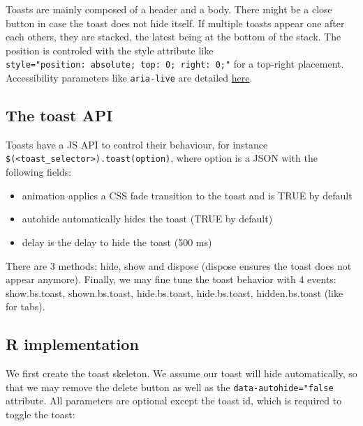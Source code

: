 \documentclass[
]{book}
\providecommand{\tightlist}{%
  \setlength{\itemsep}{0pt}\setlength{\parskip}{0pt}}
\begin{document}
Toasts are mainly composed of a header and a body. There might be a close button in case the toast does not hide itself. If multiple toasts appear one after each others, they are stacked, the latest being at the bottom of the stack. The position is controled with the style attribute like \texttt{style="position:\ absolute;\ top:\ 0;\ right:\ 0;"} for a top-right placement. Accessibility parameters like \texttt{aria-live} are detailed \href{https://getbootstrap.com/docs/4.3/components/toasts/\#accessibility}{here}.

\hypertarget{the-toast-api}{%
\subsection{The toast API}\label{the-toast-api}}

Toasts have a JS API to control their behaviour, for instance \texttt{\$(\textquotesingle{}\textless{}toast\_selector\textgreater{}\textquotesingle{}).toast(option)}, where option is a JSON with the following fields:

\begin{itemize}
\tightlist
\item
  animation applies a CSS fade transition to the toast and is TRUE by default
\item
  autohide automatically hides the toast (TRUE by default)
\item
  delay is the delay to hide the toast (500 ms)
\end{itemize}

There are 3 methods: hide, show and dispose (dispose ensures the toast does not appear anymore). Finally, we may fine tune the toast behavior with 4 events: show.bs.toast, shown.bs.toast, hide.bs.toast, hide.bs.toast, hidden.bs.toast (like for tabs).

\hypertarget{r-implementation}{%
\subsection{R implementation}\label{r-implementation}}

We first create the toast skeleton. We assume our toast will hide automatically, so that we may remove the delete button as well as the \texttt{data-autohide="false} attribute. All parameters are optional except the toast id, which is required to toggle the toast:
\end{document}
